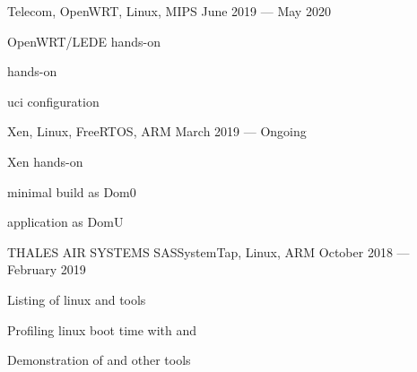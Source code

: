 
    {}{Telecom, OpenWRT, Linux, MIPS}
    {June 2019 --- May 2020}
    {\begin{additems}
        \item OpenWRT/LEDE  hands-on
        \item {} hands-on
        \item {} uci configuration
    \end{additems}}

    {}{Xen, Linux, FreeRTOS, ARM}
    {March 2019 --- Ongoing}
    {\begin{additems}
        \item Xen  hands-on
        \item {} minimal build as Dom0
        \item {} application as DomU
    \end{additems}}


    {THALES AIR SYSTEMS SAS}{SystemTap, Linux, ARM}
    {October 2018 --- February 2019}
    {\begin{additems}
        \item Listing of linux  and  tools
        \item Profiling linux boot time with  and 
        \item Demonstration of  and other tools
    \end{additems}}

